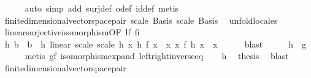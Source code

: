 \begin{isabellebody}
\ \ \ \ \isamarkupfalse%
\ {\isacharparenleft}{\kern0pt}auto\ simp\ add{\isacharcolon}{\kern0pt}\ surj{\isacharunderscore}{\kern0pt}def\ o{\isacharunderscore}{\kern0pt}def\ id{\isacharunderscore}{\kern0pt}def{\isacharparenright}{\kern0pt}\ metis\isanewline
\ \ \isamarkupfalse%
\ finite{\isacharunderscore}{\kern0pt}dimensional{\isacharunderscore}{\kern0pt}vector{\isacharunderscore}{\kern0pt}space{\isacharunderscore}{\kern0pt}pair\ scale\ Basis\ scale\ Basis\ \isamarkupfalse%
\ unfold{\isacharunderscore}{\kern0pt}locales\isanewline
\ \ \isamarkupfalse%
\ linear{\isacharunderscore}{\kern0pt}surjective{\isacharunderscore}{\kern0pt}isomorphism{\isacharbrackleft}{\kern0pt}OF\ lf\ fi{\isacharbrackright}{\kern0pt}\isanewline
\ \ \isamarkupfalse%
\ h{\isacharcolon}{\kern0pt}{\isacharcolon}{\kern0pt}\ {\isachardoublequoteopen}{\isacharprime}{\kern0pt}b\ {\isasymRightarrow}\ {\isacharprime}{\kern0pt}b{\isachardoublequoteclose}\ \ h{\isacharcolon}{\kern0pt}\ {\isachardoublequoteopen}linear\ scale\ scale\ h{\isachardoublequoteclose}\ {\isachardoublequoteopen}{\isasymforall}x{\isachardot}{\kern0pt}\ h\ {\isacharparenleft}{\kern0pt}f\ x{\isacharparenright}{\kern0pt}\ {\isacharequal}{\kern0pt}\ x{\isachardoublequoteclose}\ {\isachardoublequoteopen}{\isasymforall}x{\isachardot}{\kern0pt}\ f\ {\isacharparenleft}{\kern0pt}h\ x{\isacharparenright}{\kern0pt}\ {\isacharequal}{\kern0pt}\ x{\isachardoublequoteclose}\isanewline
\ \ \ \ \isamarkupfalse%
\ blast\isanewline
\ \ \isamarkupfalse%
\ \isamarkupfalse%
\ {\isachardoublequoteopen}h\ {\isacharequal}{\kern0pt}\ g{\isachardoublequoteclose}\isanewline
\ \ \ \ \isamarkupfalse%
\ {\isacharparenleft}{\kern0pt}metis\ gf\ isomorphism{\isacharunderscore}{\kern0pt}expand\ left{\isacharunderscore}{\kern0pt}right{\isacharunderscore}{\kern0pt}inverse{\isacharunderscore}{\kern0pt}eq{\isacharparenright}{\kern0pt}\isanewline
\ \ \isamarkupfalse%
\ h{\isacharparenleft}{\kern0pt}{}{\isacharparenright}{\kern0pt}\ \isamarkupfalse%
\ {\isacharquery}{\kern0pt}thesis\ \isamarkupfalse%
\ blast\isanewline
{}\isamarkupfalse%
%
\endisatagproof
{\isafoldproof}%
%
\isadelimproof
\isanewline
%
\endisadelimproof
\isanewline
{}\isamarkupfalse%
\isanewline
\isanewline
{}\isamarkupfalse%
\ finite{\isacharunderscore}{\kern0pt}dimensional{\isacharunderscore}{\kern0pt}vector{\isacharunderscore}{\kern0pt}space{\isacharunderscore}{\kern0pt}pair\ \isanewline

\end{isabellebody}
